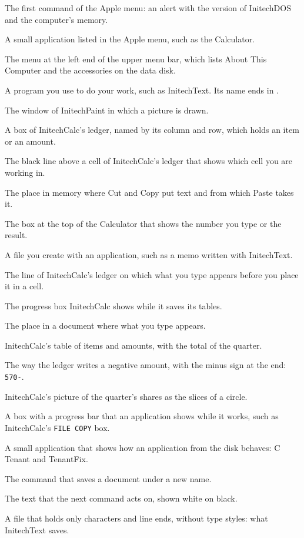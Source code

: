 The first command of the Apple menu: an
alert with the version of InitechDOS and the computer's memory.

A small application listed in the Apple menu, such
as the Calculator.

The menu at the left end of the upper menu bar,
which lists About This Computer and the accessories on the data disk.

A program you use to do your work, such as
InitechText.  Its name ends in .

The window of InitechPaint in which a picture is
drawn.

A box of InitechCalc's ledger, named by its column and
row, which holds an item or an amount.

The black line above a cell of InitechCalc's
ledger that shows which cell you are working in.

The place in memory where Cut and Copy put text and
from which Paste takes it.

The box at the top of the Calculator that shows the
number you type or the result.

A file you create with an application, such as a
memo written with InitechText.

The line of InitechCalc's ledger on which what
you type appears before you place it in a cell.

The progress box InitechCalc shows while it saves
its tables.

The place in a document where what you type
appears.

InitechCalc's table of items and amounts, with the
total of the quarter.

The way the ledger writes a negative amount,
with the minus sign at the end: \texttt{570-}.

InitechCalc's picture of the quarter's shares as
the slices of a circle.

A box with a progress bar that an application
shows while it works, such as InitechCalc's \texttt{FILE COPY} box.

A small application that shows how an
application from the disk behaves: C Tenant and TenantFix.

The command that saves a document under a new name.

The text that the next command acts on, shown
white on black.

A file that holds only characters and line ends,
without type styles: what InitechText saves.
